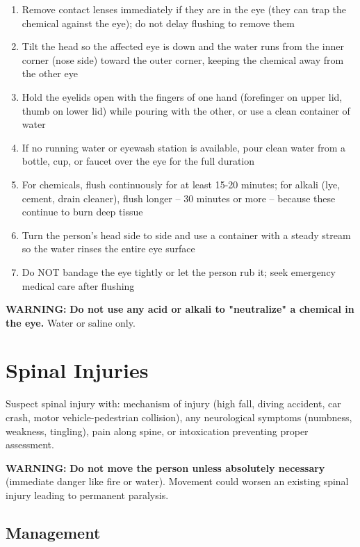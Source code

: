\begin{enumerate}[leftmargin=*]
\item Remove contact lenses immediately if they are in the eye (they can trap the chemical against the eye); do not delay flushing to remove them
\item Tilt the head so the affected eye is down and the water runs from the inner corner (nose side) toward the outer corner, keeping the chemical away from the other eye
\item Hold the eyelids open with the fingers of one hand (forefinger on upper lid, thumb on lower lid) while pouring with the other, or use a clean container of water
\item If no running water or eyewash station is available, pour clean water from a bottle, cup, or faucet over the eye for the full duration
\item For chemicals, flush continuously for at least 15-20 minutes; for alkali (lye, cement, drain cleaner), flush longer -- 30 minutes or more -- because these continue to burn deep tissue
\item Turn the person's head side to side and use a container with a steady stream so the water rinses the entire eye surface
\item Do NOT bandage the eye tightly or let the person rub it; seek emergency medical care after flushing
\end{enumerate}

\textbf{WARNING:} \textbf{Do not use any acid or alkali to "neutralize" a chemical in the eye.} Water or saline only.

\section{Spinal Injuries}

Suspect spinal injury with: mechanism of injury (high fall, diving accident, car crash, motor vehicle-pedestrian collision), any neurological symptoms (numbness, weakness, tingling), pain along spine, or intoxication preventing proper assessment.

\textbf{WARNING:} \textbf{Do not move the person unless absolutely necessary} (immediate danger like fire or water). Movement could worsen an existing spinal injury leading to permanent paralysis.

\subsection{Management}

